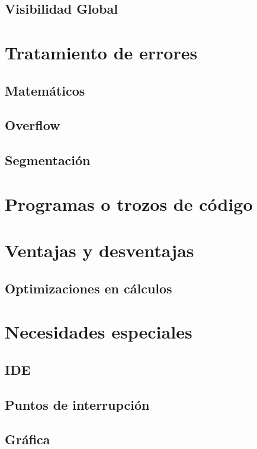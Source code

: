 \documentclass[12pt,a4paper]{article}
\begin{document}
\subsection{Visibilidad Global}
\section{Tratamiento de errores}
\subsection{Matemáticos}
\subsection{Overflow}
\subsection{Segmentación}
\section{Programas o trozos de código}
\section{Ventajas y desventajas}
\subsection{Optimizaciones en cálculos}
\section{Necesidades especiales}
\subsection{IDE}
\subsection{Puntos de interrupción}
\subsection{Gráfica}
\end{document}
